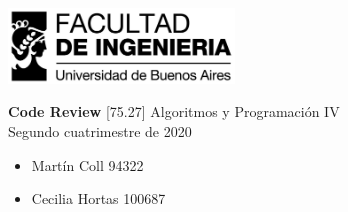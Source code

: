 \documentclass[a4paper]{article}
\newcommand{\materia}{[75.27] Algoritmos y Programación IV}
\newcommand{\trabajo}{Code Review}
\newcommand{\cuatrimestre}{Segundo cuatrimestre de 2020}
\begin{document}
\setcounter{page}{1}
	
\begin{titlepage}
	\hfill\includegraphics[width=6cm]{fiuba.jpg}
    \begin{center}
    \vfill
    \Huge \textbf{\trabajo}
    \vskip2cm
    \Large \materia\\
    \cuatrimestre
    \vfill
	\begin{itemize}
		\item Martín Coll 94322
		\item Cecilia Hortas 100687
	\end{itemize}
    \vskip1cm
    \end{center}
\end{titlepage}
\end{document}
